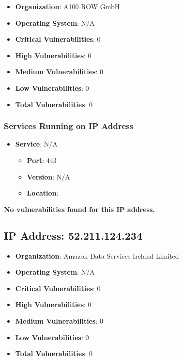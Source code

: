 \documentclass{article}
\begin{document}
\begin{itemize}
    \item \textbf{Organization}: A100 ROW GmbH
    \item \textbf{Operating System}:  N/A 
    \item \textbf{Critical Vulnerabilities}: 0
    \item \textbf{High Vulnerabilities}: 0
    \item \textbf{Medium Vulnerabilities}: 0
    \item \textbf{Low Vulnerabilities}: 0
    \item \textbf{Total Vulnerabilities}: 0
\end{itemize}

\subsubsection*{Services Running on IP Address}

\begin{itemize}
    
        \item \textbf{Service}: N/A
        \begin{itemize}
            \item \textbf{Port}: 443
            \item \textbf{Version}:  N/A 
            \item \textbf{Location}: \href{  }{  }
        \end{itemize}
    
\end{itemize}


\textbf{No vulnerabilities found for this IP address.}




\clearpage



\subsection*{IP Address: 52.211.124.234}

\begin{itemize}
    \item \textbf{Organization}: Amazon Data Services Ireland Limited
    \item \textbf{Operating System}:  N/A 
    \item \textbf{Critical Vulnerabilities}: 0
    \item \textbf{High Vulnerabilities}: 0
    \item \textbf{Medium Vulnerabilities}: 0
    \item \textbf{Low Vulnerabilities}: 0
    \item \textbf{Total Vulnerabilities}: 0
\end{itemize}
\end{document}
